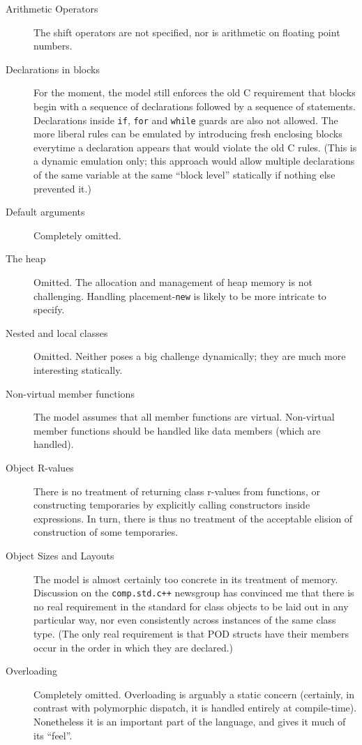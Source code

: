 \documentclass[11pt]{article}
\begin{document}
\begin{description}
\item[Arithmetic Operators]  The shift operators are not specified,
  nor is arithmetic on floating point numbers.
\item[Declarations in blocks] For the moment, the model still enforces
  the old C requirement that blocks begin with a sequence of
  declarations followed by a sequence of statements.  Declarations
  inside \texttt{if}, \texttt{for} and \texttt{while} guards are also
  not allowed.  The more liberal \cpp{} rules can be emulated by
  introducing fresh enclosing blocks everytime a declaration appears
  that would violate the old C rules.  (This is a dynamic emulation
  only; this approach would allow multiple declarations of the same
  variable at the same ``block level'' statically if nothing else
  prevented it.)
\item[Default arguments]  Completely omitted.
\item[The heap] Omitted.  The allocation and management of heap memory
  is not challenging.  Handling placement-\texttt{new} is likely to be
  more intricate to specify.
\item[Nested and local classes] Omitted.  Neither poses a big
  challenge dynamically; they are much more interesting statically.
\item[Non-virtual member functions] The model assumes that all member
  functions are virtual.  Non-virtual member functions should be
  handled like data members (which are handled).
\item[Object R-values] There is no treatment of returning class
  r-values from functions, or constructing temporaries by explicitly
  calling constructors inside expressions.  In turn, there is thus no
  treatment of the acceptable elision of construction of some
  temporaries.
\item[Object Sizes and Layouts] The model is almost certainly too
  concrete in its treatment of memory.  Discussion on the
  \texttt{comp.std.c++} newsgroup has convinced me that there is no
  real requirement in the standard for class objects to be laid out in
  any particular way, nor even consistently across instances of the
  same class type.  (The only real requirement is that POD structs
  have their members occur in the order in which they are declared.)
\item[Overloading] Completely omitted. Overloading is arguably a
  static concern (certainly, in contrast with polymorphic dispatch, it
  is handled entirely at compile-time).  Nonetheless it is an
  important part of the language, and gives it much of its ``feel''.
\end{description}
\end{document}
